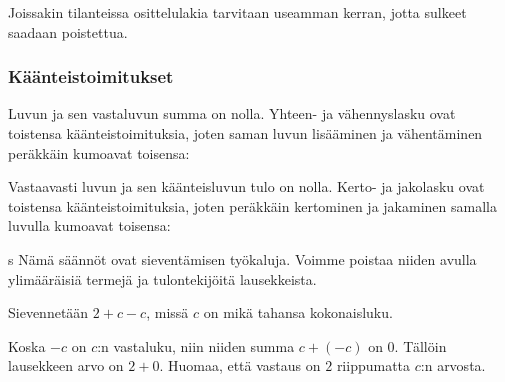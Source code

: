 Joissakin tilanteissa osittelulakia tarvitaan useamman kerran, jotta sulkeet saadaan poistettua.

%


\subsubsection*{Käänteistoimitukset}

Luvun ja sen vastaluvun summa on nolla. Yhteen- ja vähennyslasku ovat toistensa käänteistoimituksia, joten saman luvun lisääminen ja vähentäminen peräkkäin kumoavat toisensa:


Vastaavasti luvun ja sen käänteisluvun tulo on nolla. Kerto- ja jakolasku ovat toistensa käänteistoimituksia, joten peräkkäin kertominen ja jakaminen samalla luvulla kumoavat toisensa:

s
Nämä säännöt ovat sieventämisen työkaluja. Voimme poistaa niiden avulla ylimääräisiä termejä ja tulontekijöitä lausekkeista.

\begin{esimerkki} 
    Sievennetään $2+c-c$, missä $c$ on mikä tahansa kokonaisluku.\vspace*{11pt}
   
    Koska $-c$ on $c$:n vastaluku, niin niiden summa $c+(-c)$ on $0$. Tällöin lausekkeen arvo on $2+0$. Huomaa, että vastaus on $2$ riippumatta $c$:n arvosta.
\end{esimerkki}

